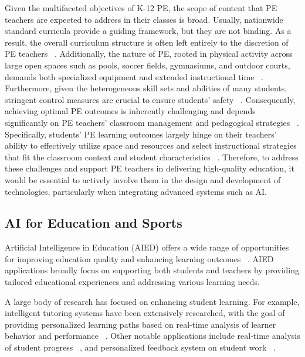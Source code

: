 Given the multifaceted objectives of K-12 PE, the scope of content that PE teachers are expected to address in their classes is broad. Usually, nationwide standard curricula provide a guiding framework, but they are not binding. As a result, the overall curriculum structure is often left entirely to the discretion of PE teachers ~\cite{landi2021physical}. Additionally, the nature of PE, rooted in physical activity across large open spaces such as pools, soccer fields, gymnasiums, and outdoor courts, demands both specialized equipment and extended instructional time ~\cite{cothran2014classroom, Bevans2010Physical}. Furthermore, given the heterogeneous skill sets and abilities of many students, stringent control measures are crucial to ensure students' safety ~\cite{chepyator2003pre, o1994rules, siedentop2022introduction}. Consequently, achieving optimal PE outcomes is inherently challenging and depends significantly on PE teachers' classroom management and pedagogical strategies ~\cite{Rimmer1989Confrontation}. Specifically, students' PE learning outcomes largely hinge on their teachers' ability to effectively utilize space and resources and select instructional strategies that fit the classroom context and student characteristics ~\cite{Powell2014Teachers, sieberer2016effective}. Therefore, to address these challenges and support PE teachers in delivering high-quality education, it would be essential to actively involve them in the design and development of technologies, particularly when integrating advanced systems such as AI.



\subsection{AI for Education and Sports} 
Artificial Intelligence in Education (AIED) offers a wide range of opportunities for improving education quality and enhancing learning outcomes ~\cite{crompton2021potential, crompton2020psychological, chen2020artificial}. AIED applications broadly focus on supporting both students and teachers by providing tailored educational experiences and addressing various learning needs.

A large body of research has focused on enhancing student learning. For example, intelligent tutoring systems have been extensively researched, with the goal of providing personalized learning paths based on real-time analysis of learner behavior and performance ~\cite{vanlehn2011relative, ma2014intelligent}. Other notable applications include real-time analysis of student progress ~\cite{mirzaeian2016learning, roschelle2020ai}, and personalized feedback system on student work ~\cite{foster2019barriers, zhu2020effect}.

